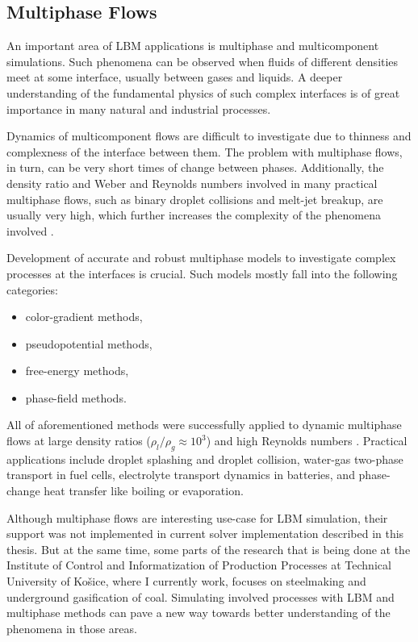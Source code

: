 \subsection{Multiphase Flows}
An important area of LBM applications is multiphase and multicomponent simulations. Such phenomena can be observed when fluids of different densities meet at some interface, usually between gases and liquids. A deeper understanding of the fundamental physics of such complex interfaces is of great importance in many natural and industrial processes. 

Dynamics of multicomponent flows are difficult to investigate due to thinness and complexness of the interface between them. The problem with multiphase flows, in turn, can be very short times of change between phases. Additionally, the density ratio and Weber and Reynolds numbers involved in many practical multiphase flows, such as binary droplet collisions and melt-jet breakup, are usually very high, which further increases the complexity of the phenomena involved \citep{feiModelingRealisticMultiphase2019}. 

Development of accurate and robust multiphase models to investigate complex processes at the interfaces is crucial. Such models mostly fall into the following categories:

\begin{itemize}
	\item color-gradient methods,
	\item pseudopotential methods,
	\item free-energy methods,
	\item phase-field methods.
\end{itemize}

All of aforementioned methods were successfully applied to dynamic multiphase flows at large density ratios ($\rho_l / \rho_g \approx 10^3$) and high Reynolds numbers \citep{liLatticeBoltzmannMethods2016a}. Practical applications include droplet splashing and droplet collision, water-gas two-phase transport in fuel cells, electrolyte transport dynamics in batteries, and phase-change heat transfer like boiling or evaporation.

Although multiphase flows are interesting use-case for LBM simulation, their support was not implemented in current solver implementation described in this thesis. But at the same time, some parts of the research that is being done at the Institute of Control and Informatization of Production Processes at Technical University of Košice, where I currently work, focuses on steelmaking and underground gasification of coal. Simulating involved processes with LBM and multiphase methods can pave a new way towards better understanding of the phenomena in those areas.

